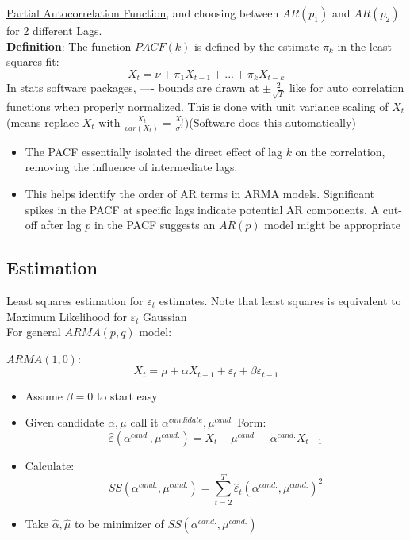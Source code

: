 \underline{Partial Autocorrelation Function}, and choosing between $AR(p_1)$ and $AR(p_2)$ for 2 different Lags. \\

\textbf{\underline{Definition}}: \quad The function $PACF(k)$ is defined by the estimate $\pi_k$ in the least squares fit: \[
X_t=\nu +\pi_1 X_{t-1} +...+ \pi_k X_{t-k}
\]
In stats software packages, ---- bounds are drawn at $\pm \frac{2}{\sqrt{T}}$ like for auto correlation functions when properly normalized. This is done with unit variance scaling of $X_t$ (means replace $X_t$ with $\frac{X_t}{var(X_t)}=\frac{X_t}{\sigma^2}$)(Software does this automatically)

\begin{itemize}
    \item The PACF essentially isolated the direct effect of lag $k$ on the correlation, removing the influence of intermediate lags.
    \item This helps identify the order of AR terms in ARMA models. Significant spikes in the PACF at specific lags indicate potential AR components. A cut-off after lag $p$ in the PACF suggests an $AR(p)$ model might be appropriate
\end{itemize}

\subsection{Estimation}

Least squares estimation for $\varepsilon_t$ estimates. Note that least squares is equivalent to Maximum Likelihood for $\varepsilon_t$ Gaussian \\

For general $ARMA(p,q)$ model:

$ARMA(1,0)$: \[
X_t=\mu+\alpha X_{t-1} + \varepsilon_t+\beta\varepsilon_{t-1}
\]
\begin{itemize}
    \item Assume $\beta=0$ to start easy
    \item[] Given candidate $\alpha, \mu$ call it $\alpha^{\textit{candidate}}, \mu^{\textit{cand.}}$ Form: \[\hat{\varepsilon}(\alpha^{\textit{cand.}},\mu^{\textit{cand.}}) = X_t -\mu^{\textit{cand.}} - \alpha^{\textit{cand.}}X_{t-1}
    \]
    \item[] Calculate: \[SS(\alpha^{\textit{cand.}},\mu^{\textit{cand.}})=\sum_{t=2}^T \hat{\varepsilon}_t(\alpha^{\textit{cand.}},\mu^{\textit{cand.}} )^2 \]
    \item[] Take $\hat{\alpha}, \hat{\mu}$ to be minimizer of $SS(\alpha^{\textit{cand.}},\mu^{\textit{cand.}})$
\end{itemize}

